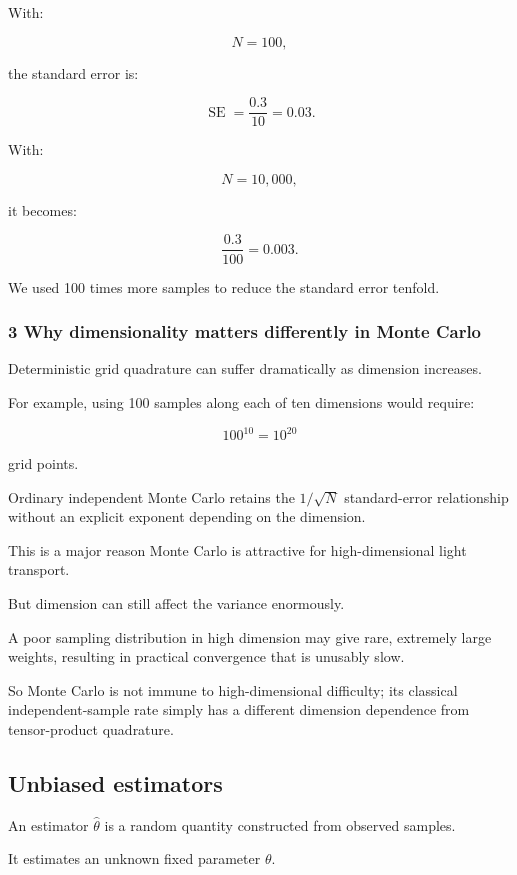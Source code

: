 With:

\[
 N=100,
\]

the standard error is:

\[
 \operatorname{SE} = \frac{0.3}{10} =\boxed{0.03}.
\]

With:

\[
 N=10{,}000,
\]

it becomes:

\[
 \frac{0.3}{100} =\boxed{0.003}.
\]

We used 100 times more samples to reduce the standard error tenfold.

\subsubsection{3 Why dimensionality matters differently in Monte Carlo}\label{02-foundations-ii-ch030-why-dimensionality-matters-differently-in-monte-carlo}

Deterministic grid quadrature can suffer dramatically as dimension increases.

For example, using 100 samples along each of ten dimensions would require:

\[
 100^{10}=10^{20}
\]

grid points.

Ordinary independent Monte Carlo retains the \(1/\sqrt N\) standard-error relationship without an explicit exponent depending on the dimension.

This is a major reason Monte Carlo is attractive for high-dimensional light transport.

But dimension can still affect the variance enormously.

A poor sampling distribution in high dimension may give rare, extremely large weights, resulting in practical convergence that is unusably slow.

So Monte Carlo is not immune to high-dimensional difficulty; its classical independent-sample rate simply has a different dimension dependence from tensor-product quadrature.

\subsection{Unbiased estimators}\label{02-foundations-ii-ch030-unbiased-estimators}

An estimator \(\widehat\theta\) is a random quantity constructed from observed samples.

It estimates an unknown fixed parameter \(\theta\).

